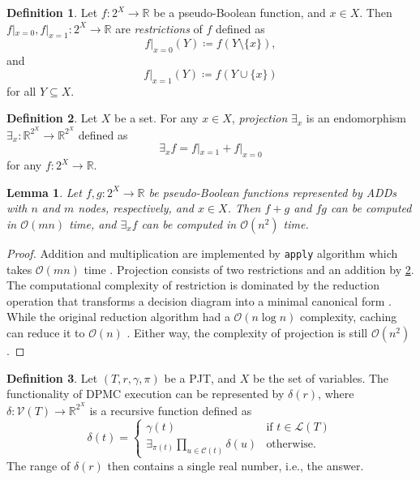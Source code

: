 \documentclass{article}
\newtheorem{lemma}{Lemma}
\theoremstyle{definition}
\newtheorem{definition}{Definition}
\theoremstyle{remark}
\begin{document}
\begin{definition}
  Let $f\colon 2^X \to \mathbb{R}$ be a pseudo-Boolean function, and $x \in X$.
  Then $f|_{x=0}, f|_{x=1}\colon 2^X \to \mathbb{R}$ are \emph{restrictions} of
  $f$ defined as
  \[
    f|_{x=0}(Y) \coloneqq f(Y \setminus \{x\}),
  \]
  and
  \[
    f|_{x=1}(Y) \coloneqq f(Y \cup \{x\})
  \]
  for all $Y \subseteq X$.
\end{definition}

\begin{definition} \label{def:projection}
  Let $X$ be a set. For any $x \in X$, \emph{projection} $\exists_x$ is an
  endomorphism $\exists_x\colon \mathbb{R}^{2^X} \to \mathbb{R}^{2^X}$ defined
  as
  \[
    \exists_xf = f|_{x=1} + f|_{x=0}
  \]
  for any $f\colon 2^X \to \mathbb{R}$.
\end{definition}

\begin{lemma} \label{lemma:basic_ops}
  Let $f,g\colon 2^X \to \mathbb{R}$ be pseudo-Boolean functions represented by
  ADDs with $n$ and $m$ nodes, respectively, and $x \in X$. Then $f+g$ and $fg$
  can be computed in $\mathcal{O}(mn)$ time, and $\exists_xf$ can be computed in
  $\mathcal{O}(n^2)$ time.
\end{lemma}
\begin{proof}
  Addition and multiplication are implemented by \texttt{apply} algorithm which
  takes $\mathcal{O}(mn)$ time \cite{DBLP:journals/tc/Bryant86}. Projection
  consists of two restrictions and an addition by \cref{def:projection}. The
  computational complexity of restriction is dominated by the reduction
  operation that transforms a decision diagram into a minimal canonical form
  \cite{DBLP:journals/tc/Bryant86}. While the original reduction algorithm had a
  $\mathcal{O}(n \log n)$ complexity, caching can reduce it to $\mathcal{O}(n)$
  \cite{somenzi1998cudd}. Either way, the complexity of projection is still
  $\mathcal{O}(n^2)$.
\end{proof}

\begin{definition} \label{def:abstraction}
  Let $(T, r, \gamma, \pi)$ be a PJT, and $X$ be the set of variables. The
  functionality of DPMC execution can be represented by $\delta(r)$, where
  $\delta\colon \mathcal{V}(T) \to \mathbb{R}^{2^X}$ is a recursive function
  defined as
  \begin{equation} \label{eq:execution}
    \delta(t) =
    \begin{cases}
      \gamma(t) & \text{if } t \in \mathcal{L}(T) \\
      \exists_{\pi(t)} \prod_{u \in \mathcal{C}(t)} \delta(u) & \text{otherwise.}
    \end{cases}
  \end{equation}
  The range of $\delta(r)$ then contains a single real number, i.e., the answer.
\end{definition}
\end{document}
